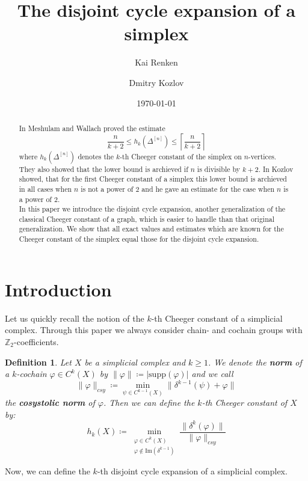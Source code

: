 \documentclass{article}
\title{The disjoint cycle expansion of a simplex}
\author{Kai Renken \and Dmitry Kozlov}
\date{\today}
\newcommand{\supp}{\mathrm{supp}}
\newcommand{\im}{\mathrm{Im}}
\newtheorem{defi}{Definition}[section]
\begin{document}
\maketitle


\begin{abstract}
In \cite{3} Meshulam and Wallach proved the estimate
\[
\frac{n}{k+2}\leq h_k(\Delta^{[n]})\leq\left\lceil\frac{n}{k+2}\right\rceil
\]
where $h_k(\Delta^{[n]})$ denotes the $k$-th Cheeger constant of the simplex on $n$-vertices. They also showed that the lower bound is archieved if $n$ is divisible by $k+2$. In \cite{2} Kozlov showed, that for the first Cheeger constant of a simplex this lower bound is archieved in all cases when $n$ is not a power of $2$ and he gave an estimate for the case when $n$ is a power of $2$.\\
In this paper we introduce the disjoint cycle expansion, another generalization of the classical Cheeger constant of a graph, which is easier to handle than that original generalization. We show that all exact values and estimates which are known for the Cheeger constant of the simplex equal those for the disjoint cycle expansion. 
\end{abstract}

\section{Introduction}

Let us quickly recall the notion of the $k$-th Cheeger constant of a simplicial complex. Through this paper we always consider chain- and cochain groups with $\mathbb{Z}_2$-coefficients.\\

\begin{defi}
Let $X$ be a simplicial complex and $k\geq 1$. We denote the \textbf{norm} of a $k$-cochain $\varphi\in C^k(X)$ by $\|\varphi\|\coloneqq |\supp(\varphi)|$ and we call
\[
\|\varphi\|_{csy}\coloneqq\min\limits_{\psi\in C^{k-1}(X)}\|\delta^{k-1}(\psi)+\varphi\|
\]
the \textbf{cosystolic norm} of $\varphi$. Then we can define the $k$-th Cheeger constant of $X$ by:
\[
h_k(X)\coloneqq\min_{\substack{\varphi\in C^k(X)\\\varphi\notin\im(\delta^{k-1})}}\frac{\|\delta^k(\varphi)\|}{\|\varphi\|_{csy}}
\]
\end{defi}

Now, we can define the $k$-th disjoint cycle expansion of a simplicial complex.
\end{document}
